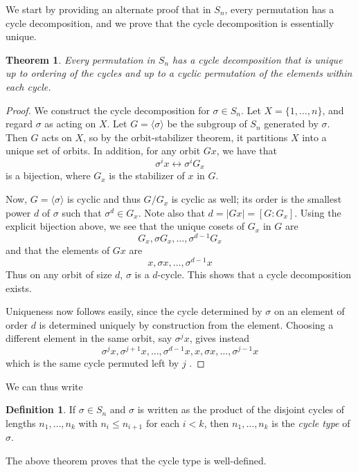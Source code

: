 \documentclass[12pt]{article}
\newtheorem{thm}{Theorem}
\theoremstyle{definition}
\newtheorem{defn}{Definition}
\begin{document}
We start by providing an alternate proof that in $S_n$, every permutation has a cycle decomposition, and we prove that the cycle decomposition is essentially unique.

\begin{thm} Every permutation in $S_n$ has a cycle decomposition that is unique up to ordering of the cycles and up to a cyclic permutation of the elements within each cycle.
\end{thm}
\begin{proof}
We construct the cycle decomposition for $\sigma\in S_n$. Let $X=\{1,\ldots,n\}$, and regard $\sigma$ as acting on $X$. Let $G=\langle \sigma\rangle$ be the subgroup of $S_n$ generated by $\sigma$. Then $G$ acts on $X$, so by the orbit-stabilizer theorem, it partitions $X$ into a unique set of orbits. In addition, for any orbit $Gx$, we have that
\[\sigma^i x \leftrightarrow \sigma^i G_x\]
is a bijection, where $G_x$ is the stabilizer of $x$ in $G$.

Now, $G=\langle \sigma\rangle$ is cyclic and thus $G/G_x$ is cyclic as well; its order is the smallest power $d$ of $\sigma$ such that $\sigma^d\in G_x$. Note also that $d=\lvert Gx\rvert=[G:G_x]$. Using the explicit bijection above, we see that the unique cosets of $G_x$ in $G$ are
\[G_x, \sigma G_x, \ldots,\sigma^{d-1} G_x\]
and that the elements of $Gx$ are
\[x, \sigma x, \ldots, \sigma^{d-1}x\]
Thus on any orbit of size $d$, $\sigma$ is a $d$-cycle. This shows that a cycle decomposition exists.

Uniqueness now follows easily, since the cycle determined by $\sigma$ on an element of order $d$ is determined uniquely by construction from the element. Choosing a different element in the same orbit, say $\sigma^j x$, gives instead
\[\sigma^j x, \sigma^{j+1}x, \ldots,\sigma^{d-1}x, x, \sigma x,\ldots,\sigma^{j-1}x\]
which is the same cycle permuted left by $j$ .
\end{proof}

We can thus write
\begin{defn} If $\sigma\in S_n$ and $\sigma$ is written as the product of the disjoint cycles of lengths $n_1,\ldots,n_k$ with $n_i\leq n_{i+1}$ for each $i<k$, then $n_1,\ldots,n_k$ is the \emph{cycle type} of $\sigma$.
\end{defn}
The above theorem proves that the cycle type is well-defined.
\end{document}
